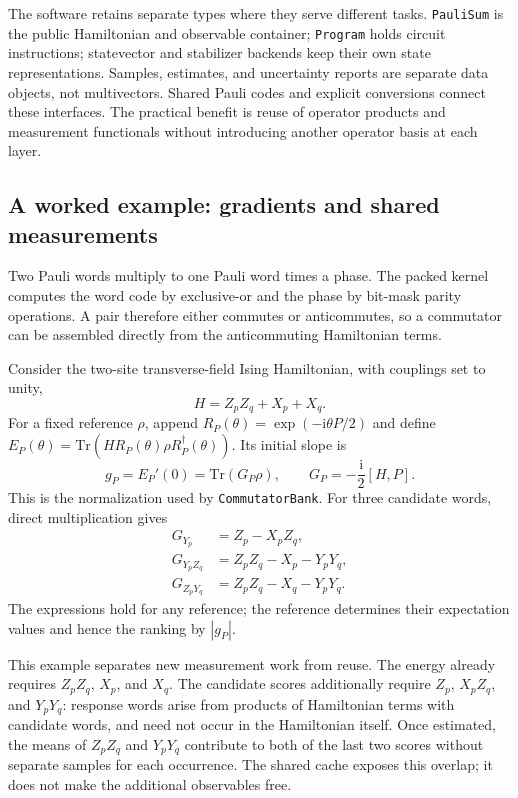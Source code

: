 \documentclass[aps,pra,reprint,superscriptaddress,nofootinbib,floatfix,
  showkeys]{revtex4-2}
\begin{document}
The software retains separate types where they serve different tasks.
\texttt{PauliSum} is the public Hamiltonian and observable container;
\texttt{Program} holds circuit instructions; statevector and stabilizer
backends keep their own state representations. Samples, estimates, and
uncertainty reports are separate data objects, not multivectors. Shared
Pauli codes and explicit conversions connect these interfaces.
The practical benefit is reuse of operator products and measurement
functionals without introducing another operator basis at each layer.

\subsection{A worked example: gradients and shared measurements}
\label{sec:operator-example}

Two Pauli words multiply to one Pauli word times a phase. The packed kernel
computes the word code by exclusive-or and the phase by bit-mask parity
operations. A pair therefore either commutes or anticommutes, so a
commutator can be assembled directly from the anticommuting Hamiltonian
terms.

Consider the two-site transverse-field Ising Hamiltonian, with couplings
set to unity,
\begin{equation}
 H=Z_pZ_q+X_p+X_q.
 \label{eq:tfim}
\end{equation}
For a fixed reference $\rho$, append
$R_P(\theta)=\exp(-\mathrm{i}\theta P/2)$ and define
$E_P(\theta)=\mathrm{Tr}(H R_P(\theta)\rho R_P^\dagger(\theta))$.
Its initial slope is
\begin{equation}
 g_P=E_P'(0)=\mathrm{Tr}(G_P\rho),\qquad
 G_P=-\frac{\mathrm{i}}{2}[H,P].
 \label{eq:score}
\end{equation}
This is the normalization used by \texttt{CommutatorBank}. For three
candidate words, direct multiplication gives
\begin{align}
 G_{Y_p} &= Z_p-X_pZ_q, \nonumber\\
 G_{Y_pZ_q} &= Z_pZ_q-X_p-Y_pY_q, \label{eq:gradients}\\
 G_{Z_pY_q} &= Z_pZ_q-X_q-Y_pY_q. \nonumber
\end{align}
The expressions hold for any reference; the reference determines their
expectation values and hence the ranking by $|g_P|$.

This example separates new measurement work from reuse. The energy already
requires $Z_pZ_q$, $X_p$, and $X_q$. The candidate scores additionally require
$Z_p$, $X_pZ_q$, and $Y_pY_q$: response words arise from products of
Hamiltonian terms with candidate words, and need not occur in the
Hamiltonian itself. Once estimated, the means of $Z_pZ_q$ and $Y_pY_q$
contribute to both of the last two scores without separate samples for
each occurrence. The shared cache exposes this overlap; it does not make
the additional observables free.
\end{document}
